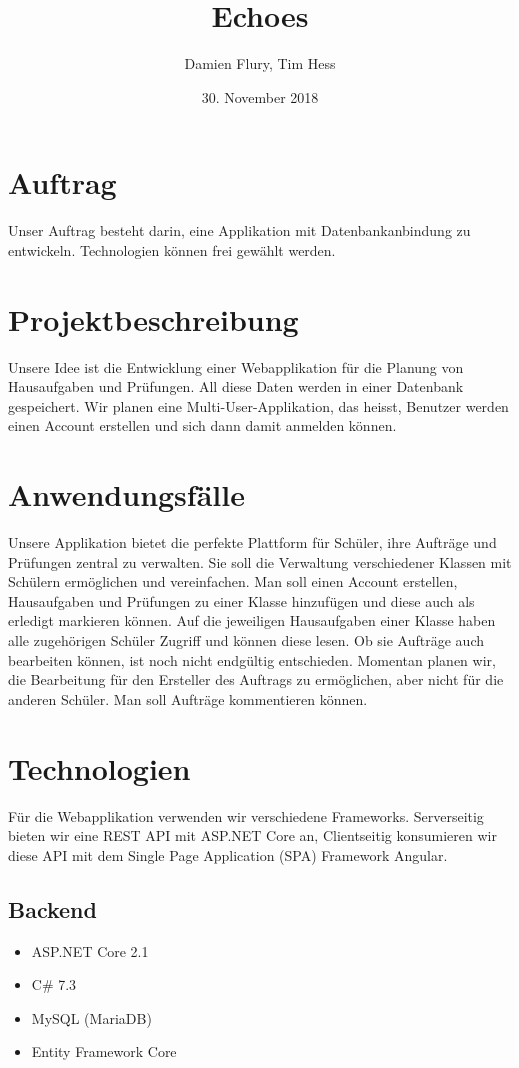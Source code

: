\documentclass[a4paper, titlepage]{article}
\title{Echoes}
\author{Damien Flury, Tim Hess}
\date{30. November 2018}
\begin{document}
    \maketitle
    \tableofcontents
    \newpage
    
    \section{Auftrag}
    Unser Auftrag besteht darin, eine Applikation mit Datenbankanbindung zu entwickeln. Technologien
    können frei gewählt werden.
    \section{Projektbeschreibung}
    Unsere Idee ist die Entwicklung einer Webapplikation für die Planung von Hausaufgaben
    und Prüfungen. All diese Daten werden in einer Datenbank gespeichert. Wir planen eine Multi-User-Applikation,
    das heisst, Benutzer werden einen Account erstellen und sich dann damit anmelden können.
    \section{Anwendungsfälle}
    Unsere Applikation bietet die perfekte Plattform für Schüler, ihre Aufträge und Prüfungen zentral zu verwalten.
    Sie soll die Verwaltung verschiedener Klassen mit Schülern ermöglichen und vereinfachen.
    Man soll einen Account erstellen, Hausaufgaben und Prüfungen zu einer Klasse hinzufügen
    und diese auch als erledigt markieren können. Auf die jeweiligen Hausaufgaben einer Klasse
    haben alle zugehörigen Schüler Zugriff und können diese lesen. Ob sie Aufträge auch bearbeiten
    können, ist noch nicht endgültig entschieden. Momentan planen wir, die Bearbeitung für den Ersteller
    des Auftrags zu ermöglichen, aber nicht für die anderen Schüler. Man soll Aufträge kommentieren
    können.
    \section{Technologien}
    Für die Webapplikation verwenden wir verschiedene Frameworks. Serverseitig bieten wir
    eine REST API mit ASP.NET Core an, Clientseitig konsumieren wir diese API mit dem Single
    Page Application (SPA) Framework Angular.
    \subsection{Backend}
    \begin{itemize}
        \item ASP.NET Core 2.1 \cite{Dotnet}
        \item C\# 7.3
        \item MySQL (MariaDB) \cite{MariaDB}
        \item Entity Framework Core
    \end{itemize}
\end{document}
